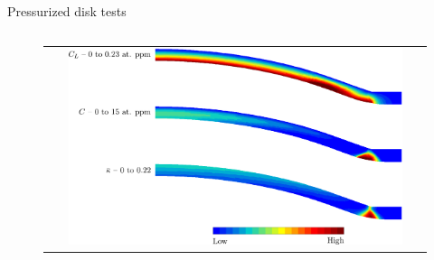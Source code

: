 \documentclass[9pt]{beamer}
\begin{document}
\begin{frame}{Pressurized disk tests}
\begin{columns}
        \begin{column}{0.55\textwidth}
            \begin{figure}
                \begin{tabular}{c}
                    \includegraphics[width=0.9\textwidth]{Images/fig_iso_values_disk.pdf}\\
                \end{tabular}
            \end{figure}
        \end{column}
    
    \end{columns}
    
\end{frame}

\end{document}
